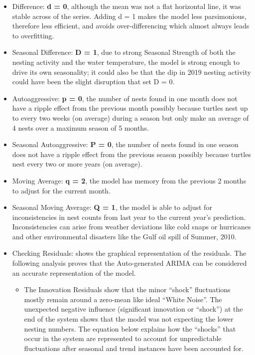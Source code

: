 \documentclass[
  letterpaper,
  DIV=11,
  numbers=noendperiod]{scrartcl}
\providecommand{\tightlist}{%
  \setlength{\itemsep}{0pt}\setlength{\parskip}{0pt}}\usepackage{longtable,booktabs,array}
\begin{document}
\begin{itemize}
\item
  Difference: \textbf{d = 0}, although the mean was not a flat
  horizontal line, it was stable across of the series. Adding d = 1
  makes the model less parsimonious, therefore less efficient, and
  avoids over-differencing which almost always leads to overfitting.
\item
  Seasonal Difference: \textbf{D = 1}, due to strong Seasonal Strength
  of both the nesting activity and the water temperature, the model is
  strong enough to drive its own seasonality; it could also be that the
  dip in 2019 nesting activity could have been the slight disruption
  that set D = 0.
\item
  Autoaggressive: \textbf{p = 0}, the number of nests found in one month
  does not have a ripple effect from the previous month possibly because
  turtles nest up to every two weeks (on average) during a season but
  only make an average of 4 nests over a maximum season of 5 months.
\item
  Seasonal Autoaggressive: \textbf{P = 0}, the number of nests found in
  one season does not have a ripple effect from the previous season
  possibly because turtles nest every two or more years (on average).
\item
  Moving Average: \textbf{q = 2}, the model has memory from the previous
  2 months to adjust for the current month.
\item
  Seasonal Moving Average: \textbf{Q = 1}, the model is able to adjust
  for inconsistencies in nest counts from last year to the current
  year's prediction. Inconsistencies can arise from weather deviations
  like cold snaps or hurricanes and other environmental disasters like
  the Gulf oil spill of Summer, 2010.
\item
  Checking Residuals: shows the graphical representation of the
  residuals. The following analysis proves that the Auto-generated ARIMA
  can be considered an accurate representation of the model.

  \begin{itemize}
  \tightlist
  \item
    The Innovation Residuals show that the minor ``shock'' fluctuations
    mostly remain around a zero-mean like ideal ``White Noise''. The
    unexpected negative influence (significant innovation or ``shock'')
    at the end of the system shows that the model was not expecting the
    lower nesting numbers. The equation below explains how the
    ``shocks'' that occur in the system are represented to account for
    unpredictable fluctuations after seasonal and trend instances have
    been accounted for.
  \end{itemize}
\end{itemize}
\end{document}
